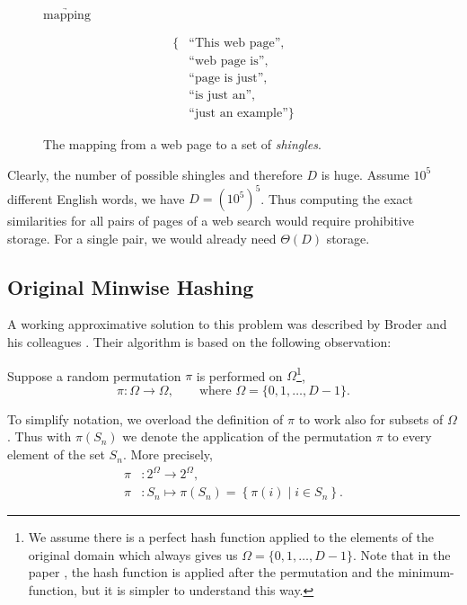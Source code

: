 \documentclass[a4paper]{article}
\begin{document}
\begin{figure}[h]
\begin{center}
\hspace{1cm} $\underrightarrow{\text{mapping}}$ \hspace{1cm}
\parbox{2cm}{
\begin{equation*}
\begin{split}
 \text{\{} & \text{``This web page''},\\ & \text{``web page is''},\\ & \text{``page is just''},\\ & \text{``is just an''},\\ & \text{``just an example''} \text{\}}
\end{split}
\end{equation*}
}
\end{center}
\caption{The mapping from a web page to a set of \emph{shingles}.}
\label{fig:shingle}
\end{figure}

Clearly, the number of possible shingles and therefore $D$ is huge. Assume $10^5$ different English words, we have $D=\left(10^5\right)^5$. Thus computing the exact similarities for all pairs of pages of a web search would require prohibitive storage. For a single pair, we would already need $\Theta(D)$ storage.

\subsection{Original Minwise Hashing}

A working approximative solution to this problem was described by Broder and his colleagues \citep{Broder:1998,BroderGMZ97}. Their algorithm is based on the following observation:

Suppose a random permutation $\pi$ is performed on $\Omega$\footnote{We assume there is a perfect hash function applied to the elements of the original domain which always gives us $\Omega = \{0,1,\ldots,D-1\}$. Note that in the paper \citep{LiK11}, the hash function is applied after the permutation and the minimum-function, but it is simpler to understand this way.},
\[
\pi:\Omega \longrightarrow \Omega, \qquad \text{where } \Omega = \{0,1,\ldots,D-1\}.
\]

To simplify notation, we overload the definition of $\pi$ to work also for subsets of $\Omega$. Thus with $\pi(S_n)$ we denote the application of the permutation $\pi$ to every element of the set $S_n$. More precisely,
\begin{equation*}
\begin{split}
\pi &: 2^\Omega \longrightarrow 2^\Omega, \\
\pi &: S_n \longmapsto \pi \left( S_n \right) = \left\lbrace \pi \left( i \right) \middle\vert i \in S_n \right\rbrace. 
\end{split}
\end{equation*}
\end{document}
